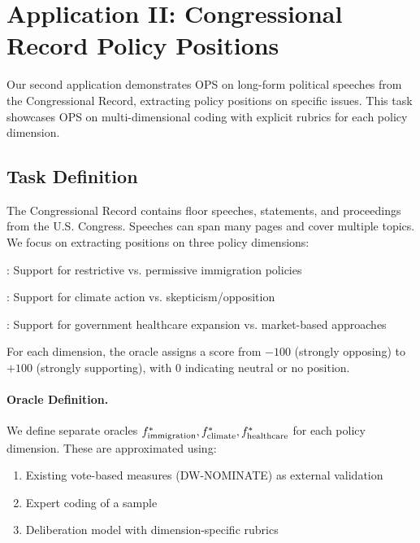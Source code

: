 \section{Application II: Congressional Record Policy Positions}\label{sec:congressional}

Our second application demonstrates OPS on long-form political speeches from the Congressional Record, extracting policy positions on specific issues. This task showcases OPS on multi-dimensional coding with explicit rubrics for each policy dimension.

\subsection{Task Definition}

The Congressional Record contains floor speeches, statements, and proceedings from the U.S. Congress. Speeches can span many pages and cover multiple topics. We focus on extracting positions on three policy dimensions:

\begin{description}[nosep]
    \item[Immigration]: Support for restrictive vs. permissive immigration policies
    \item[Climate]: Support for climate action vs. skepticism/opposition
    \item[Healthcare]: Support for government healthcare expansion vs. market-based approaches
\end{description}

For each dimension, the oracle assigns a score from $-100$ (strongly opposing) to $+100$ (strongly supporting), with $0$ indicating neutral or no position.

\paragraph{Oracle Definition.}
We define separate oracles $f^{\ast}_{\text{immigration}}, f^{\ast}_{\text{climate}}, f^{\ast}_{\text{healthcare}}$ for each policy dimension. These are approximated using:
\begin{enumerate}[nosep]
    \item Existing vote-based measures (DW-NOMINATE) as external validation
    \item Expert coding of a sample
    \item Deliberation model with dimension-specific rubrics
\end{enumerate}

